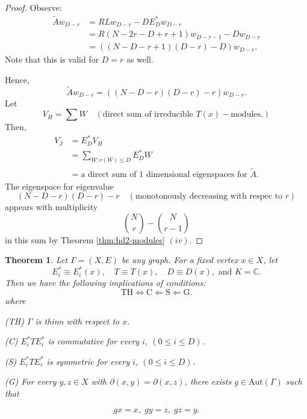 \documentclass[
]{book}
\newtheorem{theorem}{Theorem}[chapter]
\theoremstyle{definition}
\theoremstyle{definition}
\theoremstyle{definition}
\theoremstyle{definition}
\theoremstyle{remark}
\begin{document}
\begin{proof}
Observe:
\begin{align}
\tilde{A}w_{D-r} & = RLw_{D-r} - DE_D^*w_{D-r}\\
& = R(N-2r-D+r+1)w_{D-r-1} - Dw_{D-r}\\
& = ((N-D-r+1)(D-r) - D)w_{D-r}.
\end{align}
Note that this is valid for \(D = r\) as well.

Hence,
\[\tilde{A}w_{D-r}  = ((N-D-r)(D-r)-r)w_{D-r}.\]
Let
\[V_H = \sum W \quad (\text{direct sum of irreducible }T(x)-\text{modules}.)\]
Then,
\begin{align}
V_J & = E_D^*V_H\\
& = \sum_{W:r(W)\leq D} E_D^*W\\
& = \text{a direct sum of 1 dimensional eigenspaces for }\tilde{A}.
\end{align}
The eigenspace for eigenvalue
\[(N-D-r)(D-r)-r \quad (\text{monotonously decreasing with respec to }r)\]
appears with multiplicity
\[\binom{N}{r} - \binom{N}{r-1}\]
in this sum by Theorem \ref{thm:hd2-modules} \((iv)\).
\end{proof}

\begin{theorem}
\protect\hypertarget{thm:thin-condition}{}\label{thm:thin-condition}Let \(\Gamma = (X, E)\) be any graph. For a fixed vertex \(x\in X\), let
\[E_i^*\equiv E_i^*(x), \quad T\equiv T(x), \quad D \equiv D(x), \text{ and } K = \mathbb{C}.\]
Then we have the following implications of conditions:
\[\text{TH} \Leftrightarrow \text{C} \Leftarrow \text{S} \Leftarrow \text{G}.\]
where

(TH) \(\Gamma\) is thinn with respect to \(x\).

(C) \(E^*_iTE^*_i\) is commutative for every \(i\), \((0\leq i \leq D)\).

(S) \(E^*_iTE^*_i\) is symmetric for every \(i\), \((0\leq i \leq D)\).

(G) For every \(y, z\in X\) with \(\partial(x,y) = \partial(x,z)\), there exists \(g\in \mathrm{Aut}(\Gamma)\) such that

\[gx = x, \; gy = z, \; gz = y.\]
\end{theorem}
\end{document}
